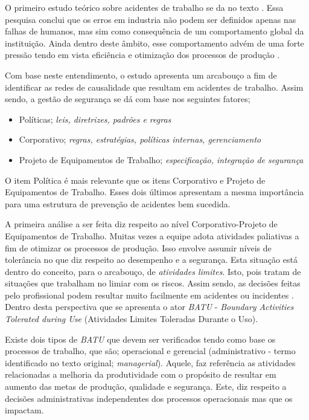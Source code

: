 O primeiro estudo teórico sobre acidentes de trabalho se da no texto \cite{riskoldschool}. Essa pesquisa conclui que os erros em industria não podem ser definidos apenas nas falhas de humanos, mas sim como consequência de um comportamento global da instituição. Ainda dentro deste âmbito, esse comportamento advém de uma forte pressão tendo em vista eficiência e otimização dos processos de produção \cite{riskoldschool} \cite{safety}.

Com base neste entendimento, o estudo \cite{safety} apresenta um arcabouço a fim de identificar as redes de causalidade que resultam em acidentes de trabalho. Assim sendo, a gestão de segurança se dá com base nos seguintes fatores; 
\begin{itemize}
    \item Políticas; \textit{leis, diretrizes, padrões e regras}
    \item Corporativo; \textit{regras, estratégias, políticas internas, gerenciamento}
    \item Projeto de Equipamentos de Trabalho; \textit{especificação, integração de segurança}
\end{itemize}

O item Política é mais relevante que os itens Corporativo e Projeto de Equipamentos de Trabalho. Esses dois últimos apresentam a mesma importância para uma estrutura de prevenção de acidentes 
bem sucedida. 

A primeira análise a ser feita diz respeito ao nível Corporativo-Projeto de Equipamentos de Trabalho. Muitas vezes a equipe adota atividades paliativas a fim de otimizar os processos de produção. Isso envolve assumir níveis de tolerância no que diz respeito ao desempenho e a segurança. Esta situação está dentro do conceito, para o arcabouço, de \textit{atividades limites}. Isto, pois tratam de situações que trabalham no limiar com os riscos. Assim sendo, as decisões feitas pelo profissional podem resultar muito facilmente em acidentes ou incidentes \cite{safety}. Dentro desta perspectiva que se apresenta o ator \textit{BATU} - \textit{Boundary Activities Tolerated during Use} (Atividades Limites Toleradas Durante o Uso).

Existe dois tipos de \textit{BATU} que devem ser verificados tendo como base os processos de trabalho, que são; operacional e gerencial (administrativo - termo identificado no texto original; \textit{managerial}). Aquele, faz referência as atividades relacionadas a melhoria da produtividade com o propósito de resultar em aumento das metas de produção, qualidade e segurança. Este, diz respeito a decisões administrativas independentes dos processos operacionais mas que os impactam.

